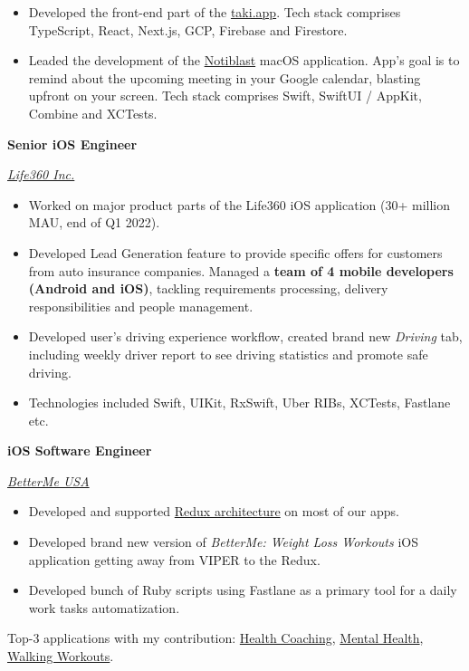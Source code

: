 \documentclass[12pt]{article}
\newcommand{\SubSectionSpacing}{
    \vspace*{0.5em}
}
\newcommand{\Experience}[3]{%
    \noindent \textbf{#1}
    \hfill \text{#2} \par
    \noindent \textit{#3} \par
    \normalsize \normalfont \par
}
\begin{document}
\noindent
\begin{itemize}[label=-]
    \setlength\itemsep{0em}
    \item Developed the front-end part of the \href{https://taki.app}{taki.app}. 
    Tech stack comprises TypeScript, React, Next.js, GCP, Firebase and Firestore.
    \item Leaded the development of the \href{https://apps.apple.com/in/app/notiblast/id6443910263}{Notiblast} macOS application.
    App's goal is to remind about the upcoming meeting in your Google calendar, blasting upfront on your screen.
    Tech stack comprises Swift, SwiftUI / AppKit, Combine and XCTests.
\end{itemize}

\SubSectionSpacing

\Experience
{Senior iOS Engineer}
{2020/01 -- 2022/04}
{\href{https://www.life360.com}{Life360 Inc.}}

\noindent
\begin{itemize}[label=-]
    \setlength\itemsep{0em}
    \item Worked on major product parts of the Life360 iOS application (30+ million MAU, end of Q1 2022). 
    \item Developed Lead Generation feature to provide specific offers for customers from auto insurance companies. 
    Managed a \textbf{team of 4 mobile developers (Android and iOS)}, tackling requirements processing, delivery responsibilities and people management. 
    \item Developed user's driving experience workflow, created brand new \textit{Driving} tab, including weekly driver report to see driving statistics and promote safe driving.
    \item Technologies included Swift, UIKit, RxSwift, Uber RIBs, XCTests, Fastlane etc.
\end{itemize}

\SubSectionSpacing

\Experience
{iOS Software Engineer}
{Nov 2018 -- Dec 2019}
{\href{https://betterme.world/about}{BetterMe USA}}

\noindent
\begin{itemize}[label=-]
    \setlength\itemsep{0em}
    \item Developed and supported \href{https://www.raywenderlich.com/books/advanced-ios-app-architecture/v3.0/chapters/6-architecture-redux}{Redux architecture} on most of our apps. 
    \item Developed brand new version of \textit{BetterMe: Weight Loss Workouts} iOS application getting away from VIPER to the Redux. 
    \item Developed bunch of Ruby scripts using Fastlane as a primary tool for a daily work tasks automatization.
\end{itemize}
\newline \noindent
Top-3 applications with my contribution: 
\href{https://apps.apple.com/us/app/betterme-weight-loss-workouts/id1264546236}{Health Coaching}, 
\href{https://apps.apple.com/us/app/betterme-calm-sleep-meditate/id1363010081}{Mental Health}, 
\href{https://apps.apple.com/us/app/betterme-walking-weightloss/id1434400695}{Walking Workouts}.
\end{document}
